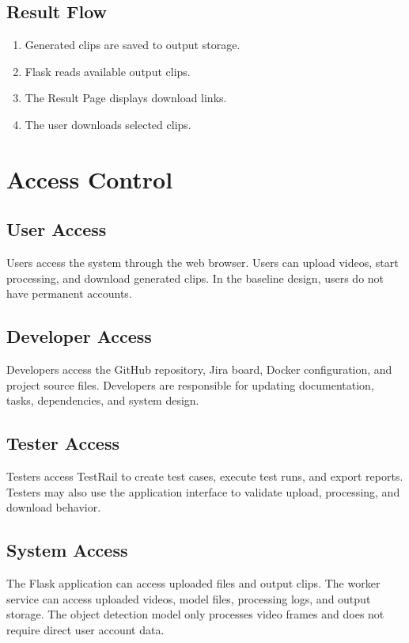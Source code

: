 \documentclass[12pt]{article}
\begin{document}
\subsection{Result Flow}
\begin{enumerate}[noitemsep]
    \item Generated clips are saved to output storage.
    \item Flask reads available output clips.
    \item The Result Page displays download links.
    \item The user downloads selected clips.
\end{enumerate}

\section{Access Control}

\subsection{User Access}
Users access the system through the web browser. Users can upload videos, start processing, and download generated clips. In the baseline design, users do not have permanent accounts.

\subsection{Developer Access}
Developers access the GitHub repository, Jira board, Docker configuration, and project source files. Developers are responsible for updating documentation, tasks, dependencies, and system design.

\subsection{Tester Access}
Testers access TestRail to create test cases, execute test runs, and export reports. Testers may also use the application interface to validate upload, processing, and download behavior.

\subsection{System Access}
The Flask application can access uploaded files and output clips. The worker service can access uploaded videos, model files, processing logs, and output storage. The object detection model only processes video frames and does not require direct user account data.
\end{document}
